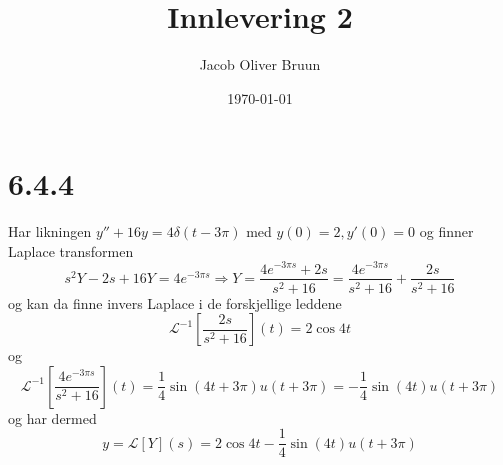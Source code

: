 \documentclass{report}
\title{Innlevering 2}
\author{Jacob Oliver Bruun}
\date{\today}
\newcommand{\nbrack}[1]{\left( #1 \right)}
\newcommand{\bbrack}[1]{\left[ #1 \right]}
\newcommand{\Lplc}[1]{\mathscr{L}\bbrack{ #1 } (s)}
\newcommand{\iLplc}[1]{\mathscr{L}^{-1}\bbrack{ #1 } (t)}
\begin{document}
\section*{6.4.4}
Har likningen $y'' + 16y = 4\delta \nbrack{t-3\pi}$ med $y(0) = 2, y'(0) = 0$ og finner Laplace transformen
\begin{equation}
  \label{eq:1}
  s^{2}Y - 2s + 16Y = 4e^{-3\pi s} \Rightarrow Y = \frac{4e^{-3\pi s} + 2s}{s^{2} + 16} = \frac{4e^{-3\pi s}}{s^{2}+ 16} + \frac{2s}{s^{2} + 16}
\end{equation}
og kan da finne invers Laplace i de forskjellige leddene
\begin{equation}
  \label{eq:2}
  \iLplc{\frac{2s}{s^{2} + 16}} = 2\cos 4t
\end{equation}
og
\begin{equation}
  \label{eq:3}
  \iLplc{\frac{4e^{-3\pi s}}{s^{2} + 16}} = \frac{1}{4} \sin \nbrack{4t + 3\pi} u\nbrack{t + 3\pi} = -\frac{1}{4} \sin (4t) u\nbrack{t + 3\pi}
\end{equation}
og har dermed
\begin{equation}
  \label{eq:4}
  y = \Lplc{Y} = 2\cos 4t - \frac{1}{4} \sin (4t) u\nbrack{t + 3\pi}
\end{equation}
\end{document}
